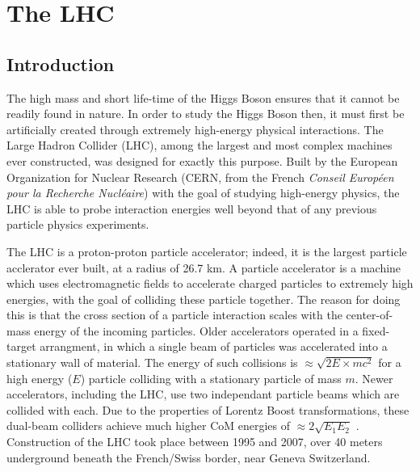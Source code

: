 \chapter{The LHC}\label{chapter:lhc}

\section{Introduction}
    The high mass and short life-time of the Higgs Boson ensures that it cannot be readily found in nature.
    In order to study the Higgs Boson then, it must first be artificially created through extremely high-energy physical interactions.
    The Large Hadron Collider (LHC), among the largest and most complex machines ever constructed, was designed for exactly this purpose.
    Built by the European Organization for Nuclear Research (CERN, from the French \textit{Conseil Européen pour la Recherche Nucléaire}) with the goal of studying high-energy physics,
    the LHC is able to probe interaction energies well beyond that of any previous particle physics experiments.

    The LHC is a proton-proton particle accelerator; indeed, it is the largest particle acclerator ever built, at a radius of 26.7 km.
    A particle accelerator is a machine which uses electromagnetic fields to accelerate charged particles to extremely high energies, with the goal of colliding these particle together.
    The reason for doing this is that the cross section of a particle interaction scales with the center-of-mass energy of the incoming particles.
    Older accelerators operated in a fixed-target arrangment, in which a single beam of particles was accelerated into a stationary wall of material.
    The energy of such collisions is $\approx \sqrt{2 E \times m c^2}$ for a high energy ($E$) particle colliding with a stationary particle of mass $m$.
    Newer accelerators, including the LHC, use two independant particle beams which are collided with each.
    Due to the properties of Lorentz Boost transformations, these dual-beam colliders achieve much higher CoM energies of $\approx 2 \sqrt{E_1 E_2}$ \cite{modern_and_future_colliders}.
    Construction of the LHC took place between 1995 and 2007, over 40 meters underground beneath the French/Swiss border, near Geneva Switzerland. 


